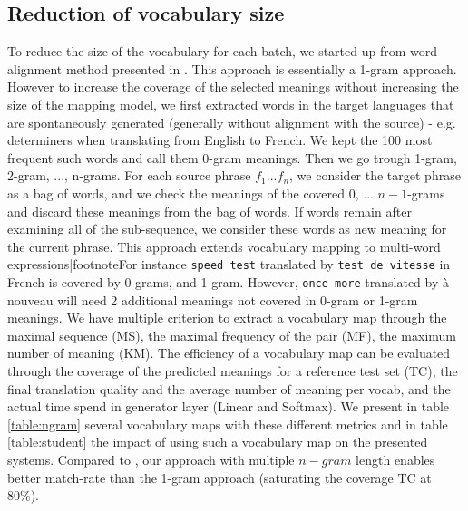 \documentclass[11pt,a4paper]{article}
\begin{document}
\subsection{Reduction of vocabulary size}
To reduce the size of the vocabulary for each batch, we started up from word alignment method presented in \cite{shi2017speeding}. This approach is essentially a 1-gram approach. However to increase the coverage of the selected meanings without increasing the size of the mapping model, we first extracted words in the target languages that are spontaneously generated (generally without alignment with the source) - e.g. determiners when translating from English to French. We kept the 100 most frequent such words and call them 0-gram meanings. Then we go trough 1-gram, 2-gram, ..., n-grams. For each source phrase $f_1 ... f_n$, we consider the target phrase as a bag of words, and we check the meanings of the covered $0$, ... $n-1$-grams and discard these meanings from the bag of words. If words remain after examining all of the sub-sequence, we consider these words as new meaning for the current phrase. This approach extends vocabulary mapping to multi-word expressions|footnote{For instance {\tt speed test} translated by {\tt test de vitesse} in French is covered by 0-grams, and 1-gram. However, {\tt once more} translated by {à nouveau} will need 2 additional meanings not covered in 0-gram or 1-gram meanings}. We have multiple criterion to extract a vocabulary map through the maximal sequence (MS), the maximal frequency of the pair (MF), the maximum number of meaning (KM). The efficiency of a vocabulary map can be evaluated through the coverage of the predicted meanings  for a reference test set (TC), the final translation quality and the average number of meaning per vocab, and the actual time spend in generator layer (Linear and Softmax).
We present in table \ref{table:ngram} several vocabulary maps with these different metrics and in table \ref{table:student} the impact of using such a vocabulary map on the presented systems. Compared to \cite{shi2017speeding}, our approach with multiple $n-gram$ length enables better match-rate than the 1-gram approach (saturating the coverage TC at 80\%).
\end{document}
